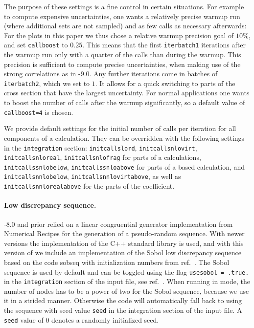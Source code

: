 The purpose of these settings is a fine control in certain situations. For example to compute expensive \PDF{} 
uncertainties, one wants a relatively precise warmup run (where additional \PDF{} sets are not sampled) and as few 
calls as necessary afterwards: For the plots in this paper we thus chose a relative warmup precision goal of $10\%$, 
and set \texttt{callboost} to $0.25$. This means that the first \texttt{iterbatch1} iterations after the warmup run 
only 
with a quarter of the calls than during the warmup. This precision is sufficient to compute precise \PDF{} 
uncertainties, when making use of the strong correlations as in \MCFM{}-9.0. Any further iterations come in batches of 
\texttt{iterbatch2}, which we set to $1$. It allows for a quick switching to parts of the \NNLO{} cross section that 
have the largest uncertainty. For normal applications one wants to boost the number of calls after the warmup 
significantly, so a default value of \texttt{callboost=4} is chosen.

We provide default settings for the initial number of calls per iteration for all components of a \NNLO{} calculation. 
They can be overridden with the following settings in the \texttt{integration} section: \texttt{initcallslord}, 
\texttt{initcallsnlovirt}, \texttt{initcallsnloreal}, \texttt{initcallsnlofrag} for parts of a \NLO{} calculations,
\texttt{initcallssnlobelow}, \texttt{initcallssnloabove} for parts of a \SCET{} based \NLO{} calculation, and 
\texttt{initcallsnnlobelow}, \texttt{initcallsnnlovirtabove}, as well as \texttt{initcallsnnlorealabove} for the parts 
of the \NNLO{} coefficient.

\paragraph{Low discrepancy sequence.}
\MCFM{}-8.0 and prior relied on a linear congruential generator implementation from Numerical Recipes for the 
generation of a pseudo-random sequence. With newer versions the \MT{} implementation of the C++ standard library is 
used, and with this version of \MCFM{} we include an implementation of the Sobol low discrepancy sequence based on the 
code sobseq \cite{Vugt2016} with initialization numbers from ref.~\cite{Joe2010}. The Sobol sequence is 
used by default and can be toggled using the flag \texttt{usesobol = .true.} in the \texttt{integration} 
section of 
the input file, see ref.~\cite{MCFM9}. When running in \MPI{} mode, the number of nodes has to be a power 
of two for the Sobol sequence, because we use it in a strided manner. Otherwise the code will automatically fall back 
to 
using the \MT{} sequence with seed value \texttt{seed} in the integration section of the input file. A \texttt{seed} 
value of $0$ denotes a randomly initialized seed.


